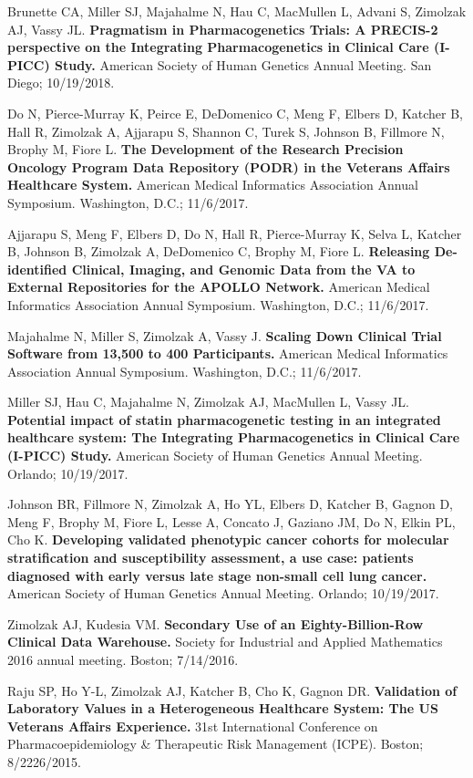 \documentclass[10pt]{article}
\begin{document}
Brunette CA, Miller SJ, Majahalme N, Hau C, MacMullen L, Advani S,
Zimolzak AJ, Vassy JL. \textbf{Pragmatism in Pharmacogenetics Trials:
  A PRECIS-2 perspective on the Integrating Pharmacogenetics in
  Clinical Care (I-PICC) Study.} American Society of Human Genetics
Annual Meeting. San Diego; 10/19/2018.

Do N, Pierce-Murray K, Peirce E, DeDomenico C, Meng F, Elbers D,
Katcher B, Hall R, Zimolzak A, Ajjarapu S, Shannon C, Turek S, Johnson
B, Fillmore N, Brophy M, Fiore L. \textbf{The Development of the
  Research Precision Oncology Program Data Repository (PODR) in the
  Veterans Affairs Healthcare System.} American Medical Informatics
Association Annual Symposium. Washington, D.C.; 11/6/2017.

Ajjarapu S, Meng F, Elbers D, Do N, Hall R, Pierce-Murray K, Selva L,
Katcher B, Johnson B, Zimolzak A, DeDomenico C, Brophy M, Fiore L.
\textbf{Releasing De-identified Clinical, Imaging, and Genomic Data
  from the VA to External Repositories for the APOLLO Network.}
American Medical Informatics Association Annual Symposium. Washington,
D.C.; 11/6/2017.

Majahalme N, Miller S, Zimolzak A, Vassy J. \textbf{Scaling Down
  Clinical Trial Software from 13,500 to 400 Participants.} American
Medical Informatics Association Annual Symposium. Washington, D.C.;
11/6/2017.

Miller SJ, Hau C, Majahalme N, Zimolzak AJ, MacMullen L, Vassy JL.
\textbf{Potential impact of statin pharmacogenetic testing in an
  integrated healthcare system: The Integrating Pharmacogenetics in
  Clinical Care (I-PICC) Study.} American Society of Human Genetics
Annual Meeting. Orlando; 10/19/2017.

Johnson BR, Fillmore N, Zimolzak A, Ho YL, Elbers D, Katcher B, Gagnon
D, Meng F, Brophy M, Fiore L, Lesse A, Concato J, Gaziano JM, Do N,
Elkin PL, Cho K. \textbf{Developing validated phenotypic cancer
  cohorts for molecular stratification and susceptibility assessment,
  a use case: patients diagnosed with early versus late stage
  non-small cell lung cancer.} American Society of Human Genetics
Annual Meeting. Orlando; 10/19/2017.

Zimolzak AJ, Kudesia VM. \textbf{Secondary Use of an
  Eighty-Billion-Row Clinical Data Warehouse.} Society for Industrial
and Applied Mathematics 2016 annual meeting. Boston; 7/14/2016.

Raju SP, Ho Y-L, Zimolzak AJ, Katcher B, Cho K, Gagnon DR.
\textbf{Validation of Laboratory Values in a Heterogeneous Healthcare
  System: The US Veterans Affairs Experience.} 31st International
Conference on Pharmacoepidemiology \& Therapeutic Risk Management
(ICPE). Boston; 8/22\ndash{}26/2015.
\end{document}
